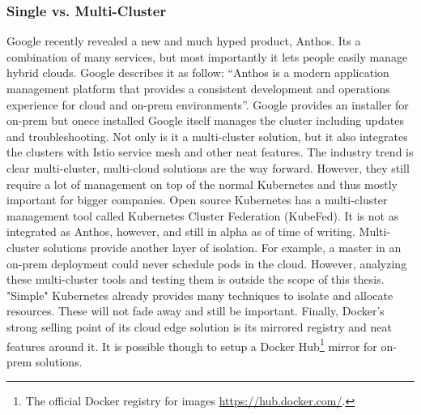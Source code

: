 \subsubsection{Single vs. Multi-Cluster}
Google recently revealed a new and much hyped product, Anthos\cite{TechnicalAnthosGoogle66:online}. Its a combination of many services, but most importantly it lets people easily manage hybrid clouds. Google describes it as follow: ``Anthos is a modern application management platform that provides a consistent development and operations experience for cloud and on-prem environments''\cite{TechnicalAnthosGoogle66:online}. Google provides an installer for on-prem but onece installed Google itself manages the cluster including updates and troubleshooting. Not only is it a multi-cluster solution, but it also integrates the clusters with Istio service mesh and other neat features. The industry trend is clear multi-cluster, multi-cloud solutions are the way forward. However, they still require a lot of management on top of the normal Kubernetes and thus mostly important for bigger companies. Open source Kubernetes has a multi-cluster management tool called Kubernetes Cluster Federation (KubeFed)\cite{kubernetesFederation97:online}. It is not as integrated as Anthos, however, and still in alpha as of time of writing. Multi-cluster solutions provide another layer of isolation. For example, a master in an on-prem deployment could never schedule pods in the cloud. However, analyzing these multi-cluster tools and testing them is outside the scope of this thesis. "Simple" Kubernetes already provides many techniques to isolate and allocate resources. These will not fade away and still be important. Finally, Docker's strong selling point of its cloud edge solution is its mirrored registry and neat features around it. It is possible though to setup a Docker Hub\footnote{The official Docker registry for images \url{https://hub.docker.com/}.} mirror for on-prem solutions. 
